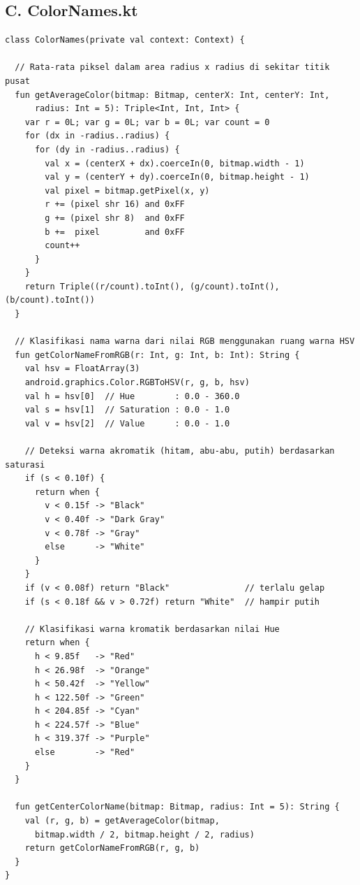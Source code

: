 {\subsection*{C. ColorNames.kt}

\begin{lstlisting}[caption={Implementasi klasifikasi nama warna berbasis ruang warna HSV dengan pendekatan \textit{rule-based thresholding}}, label={lst:colornames}]
class ColorNames(private val context: Context) {

  // Rata-rata piksel dalam area radius x radius di sekitar titik pusat
  fun getAverageColor(bitmap: Bitmap, centerX: Int, centerY: Int,
      radius: Int = 5): Triple<Int, Int, Int> {
    var r = 0L; var g = 0L; var b = 0L; var count = 0
    for (dx in -radius..radius) {
      for (dy in -radius..radius) {
        val x = (centerX + dx).coerceIn(0, bitmap.width - 1)
        val y = (centerY + dy).coerceIn(0, bitmap.height - 1)
        val pixel = bitmap.getPixel(x, y)
        r += (pixel shr 16) and 0xFF
        g += (pixel shr 8)  and 0xFF
        b +=  pixel         and 0xFF
        count++
      }
    }
    return Triple((r/count).toInt(), (g/count).toInt(), (b/count).toInt())
  }

  // Klasifikasi nama warna dari nilai RGB menggunakan ruang warna HSV
  fun getColorNameFromRGB(r: Int, g: Int, b: Int): String {
    val hsv = FloatArray(3)
    android.graphics.Color.RGBToHSV(r, g, b, hsv)
    val h = hsv[0]  // Hue        : 0.0 - 360.0
    val s = hsv[1]  // Saturation : 0.0 - 1.0
    val v = hsv[2]  // Value      : 0.0 - 1.0

    // Deteksi warna akromatik (hitam, abu-abu, putih) berdasarkan saturasi
    if (s < 0.10f) {
      return when {
        v < 0.15f -> "Black"
        v < 0.40f -> "Dark Gray"
        v < 0.78f -> "Gray"
        else      -> "White"
      }
    }
    if (v < 0.08f) return "Black"               // terlalu gelap
    if (s < 0.18f && v > 0.72f) return "White"  // hampir putih

    // Klasifikasi warna kromatik berdasarkan nilai Hue
    return when {
      h < 9.85f   -> "Red"
      h < 26.98f  -> "Orange"
      h < 50.42f  -> "Yellow"
      h < 122.50f -> "Green"
      h < 204.85f -> "Cyan"
      h < 224.57f -> "Blue"
      h < 319.37f -> "Purple"
      else        -> "Red"
    }
  }

  fun getCenterColorName(bitmap: Bitmap, radius: Int = 5): String {
    val (r, g, b) = getAverageColor(bitmap,
      bitmap.width / 2, bitmap.height / 2, radius)
    return getColorNameFromRGB(r, g, b)
  }
}


\end{lstlisting}}
